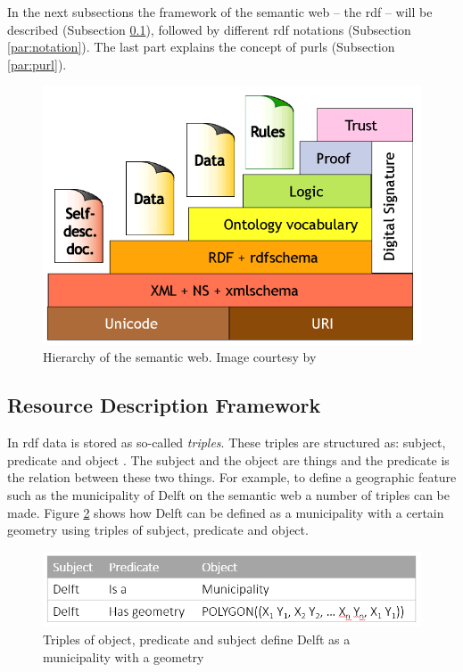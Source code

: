 In the next subsections the framework of the semantic web --  the \acf{rdf} -- will be described (Subsection \ref{par:rdf}), followed by different \ac{rdf} notations (Subsection \ref{par:notation}). The last part explains the concept of \acp{purl} (Subsection \ref{par:purl}).

\begin{figure}[!h]
	\centering
	\includegraphics[width=0.7\linewidth]{figs/semanticweb2.png}
	\caption{Hierarchy of the semantic web. Image courtesy by \cite{LD:Berners-lee3}}
	\label{fig:SemanticWeb}
\end{figure}

\subsection{Resource Description Framework}
\label{par:rdf}
In \ac{rdf} data is stored as so-called \textit{triples}. These triples are structured as: subject, predicate and object \citep{LD:Berners-lee}. The subject and the object are things and the predicate is the relation between these two things. For example, to define a geographic feature such as the municipality of Delft on the semantic web a number of triples can be made. Figure \ref{fig:Triples} shows how Delft can be defined as a municipality with a certain geometry using triples of subject, predicate and object.

\begin{figure}
	\centering
	\includegraphics[width=0.7\linewidth]{figs/Triples.png}
	\caption{Triples of object, predicate and subject define Delft as a municipality with a geometry}
	\label{fig:Triples}
\end{figure}

